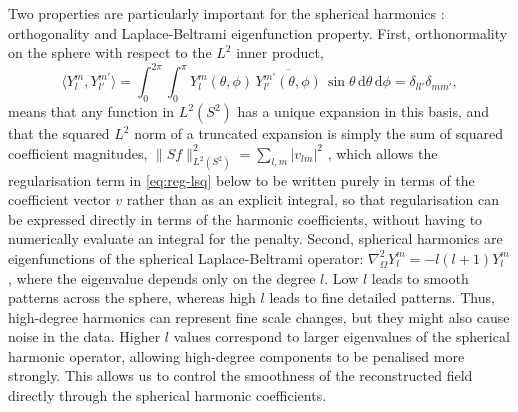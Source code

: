 Two properties are particularly important for the spherical harmonics : orthogonality and Laplace-Beltrami eigenfunction property. First, orthonormality on the sphere with respect to the $L^2$ inner product,
\begin{equation}
    \langle Y_l^m, Y_{l'}^{m'}\rangle = \int_0^{2\pi}\!\!\int_0^\pi Y_l^m(\theta,\phi)\,\overline{Y_{l'}^{m'}(\theta,\phi)}\,\sin\theta\,\mathrm{d}\theta\,\mathrm{d}\phi = \delta_{ll'}\delta_{mm'},
    \label{eq:orthogonality}
\end{equation}
means that any function in $L^2(S^2)$ has a unique expansion in this basis, and that the squared $L^2$ norm of a truncated expansion is simply the sum of squared coefficient magnitudes, $\|Sf\|^2_{L^2(S^2)} = \sum_{l,m}|v_{lm}|^2$ , which allows the regularisation term in \cref{eq:reg-lsq} below to be written purely in terms of the coefficient vector $v$ rather than as an explicit integral, so that regularisation can be expressed directly in terms of the harmonic coefficients, without having to numerically evaluate an integral for the penalty. Second, spherical harmonics are eigenfunctions of the spherical Laplace-Beltrami operator: $\nabla^2_\Omega Y_l^m = -l(l+1)Y_l^m$, where the eigenvalue depends only on the degree $l$. Low $l$ leads to smooth patterns across the sphere, whereas high $l$ leads to fine detailed patterns. Thus, high-degree harmonics can represent fine scale changes, but they might also cause noise in the data. Higher $l$ values correspond to larger eigenvalues of the spherical harmonic operator, allowing high-degree components to be penalised more strongly. This allows us to control the smoothness of the reconstructed field directly through the spherical harmonic coefficients. 

